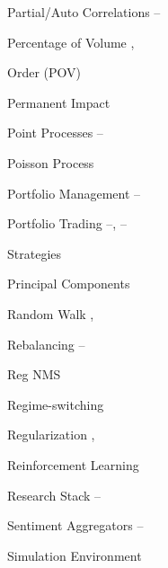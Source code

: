 \begin{multicols}{2}
{Partial/Auto Correlations \hfill \pageref{in:partac1}--\pageref{in:partac2} \par

Percentage of Volume \hfill \pageref{in:pov1}, \pageref{in:pov2} \par \hspace{0.25cm} Order (POV) \par

Permanent Impact \hfill \pageref{in:permimp} \par

Point Processes \hfill \pageref{in:point1}--\pageref{in:point2} \par

Poisson Process \hfill \pageref{in:poisson} \par

Portfolio Management \hfill \pageref{in:portman1}--\pageref{in:portman2} \par

Portfolio Trading \hfill \pageref{in:ports1}--\pageref{in:ports2}, \pageref{in:ports3}--\pageref{in:ports4} \par \hspace{0.25cm} Strategies \par

Principal Components \hfill \pageref{in:pca} \par

Random Walk \hfill \pageref{in:random1}, \pageref{in:random2} \par

Rebalancing \hfill \pageref{in:rebalance1}--\pageref{in:rebalance2} \par

Reg NMS \hfill \pageref{in:regnms} \par

Regime-switching \hfill \pageref{in:regime} \par

Regularization \hfill \pageref{in:regz1}, \pageref{in:regz2} \par

Reinforcement Learning \hfill \pageref{in:re_learning} \par

Research Stack \hfill \pageref{in:research_stack1}--\pageref{in:research_stack2} \par

Sentiment Aggregators \hfill \pageref{in:sentag1}--\pageref{in:sentag2} \par

Simulation Environment \hfill \pageref{in:sim_environ} \par

}
\end{multicols}
